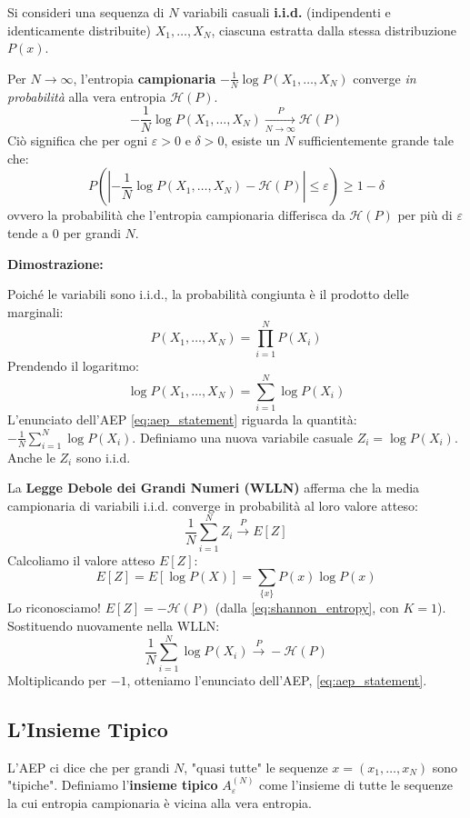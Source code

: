 \begin{enumerate}
\noindent Si consideri una sequenza di $N$ variabili casuali \textbf{i.i.d.} (indipendenti e identicamente distribuite) $X_1, \dots, X_N$, ciascuna estratta dalla stessa distribuzione $P(x)$.

\begin{tcolorbox}[colback=colorD!25!white,colframe=colorD!75!colorE,title={\textbf{Enunciato dell'AEP}}]
 Per $N \to \infty$, l'entropia \textbf{campionaria} $-\frac{1}{N} \log P(X_1, \dots, X_N)$ converge \textit{in probabilità} alla vera entropia $\mathcal{H}(P)$.
\begin{equation}
    -\frac{1}{N} \log P(X_1, \dots, X_N) \xrightarrow[N \to \infty]{P} \mathcal{H}(P)
    \label{eq:aep_statement}
\end{equation}
Ciò significa che per ogni $\varepsilon > 0$ e $\delta > 0$, esiste un $N$ sufficientemente grande tale che:
$$ P\left( \left| -\frac{1}{N} \log P(X_1, \dots, X_N) - \mathcal{H}(P) \right| \leq \varepsilon \right) \ge 1 - \delta $$
ovvero la probabilità che l'entropia campionaria differisca da $\mathcal{H}(P)$ per più di $\varepsilon$ tende a $0$ per grandi $N$.
\end{tcolorbox}

\hfill

\noindent \textbf{Dimostrazione:}

\noindent Poiché le variabili sono i.i.d., la probabilità congiunta è il prodotto delle marginali:
    $$ P(X_1, \dots, X_N) = \prod_{i=1}^N P(X_i) $$
Prendendo il logaritmo:
    $$ \log P(X_1, \dots, X_N) = \sum_{i=1}^N \log P(X_i) $$
L'enunciato dell'AEP \eqref{eq:aep_statement} riguarda la quantità: $-\frac{1}{N} \sum_{i=1}^N \log P(X_i)$.
Definiamo una nuova variabile casuale $Z_i = \log P(X_i)$. Anche le $Z_i$ sono i.i.d.

La \textbf{Legge Debole dei Grandi Numeri (WLLN)} afferma che la media campionaria di variabili i.i.d. converge in probabilità al loro valore atteso:
    $$ \frac{1}{N} \sum_{i=1}^N Z_i \xrightarrow{P} E[Z] $$
Calcoliamo il valore atteso $E[Z]$:
    $$ E[Z] = E[\log P(X)] = \sum_{\{x\}} P(x) \log P(x) $$
Lo riconosciamo! $E[Z] = -\mathcal{H}(P)$ (dalla \eqref{eq:shannon_entropy}, con $K=1$).
Sostituendo nuovamente nella WLLN:
    $$ \frac{1}{N} \sum_{i=1}^N \log P(X_i) \xrightarrow{P} -\mathcal{H}(P) $$
Moltiplicando per $-1$, otteniamo l'enunciato dell'AEP, \eqref{eq:aep_statement}.


\subsection{L'Insieme Tipico}
L'AEP ci dice che per grandi $N$, "quasi tutte" le sequenze $x = (x_1, \dots, x_N)$ sono "tipiche".
Definiamo l'\textbf{insieme tipico} $A_\varepsilon^{(N)}$ come l'insieme di tutte le sequenze la cui entropia campionaria è vicina alla vera entropia.


\end{enumerate}
